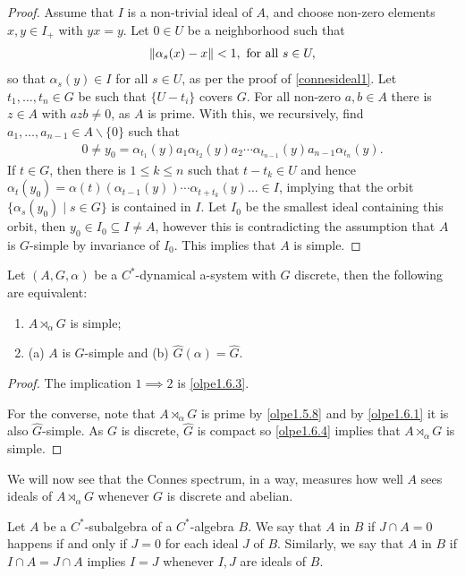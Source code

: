 \begin{proof}
	Assume that $I$ is a non-trivial ideal of $A$, and choose non-zero elements $x,y \in I_+$ with $yx=y$. Let $0 \in U$ be a neighborhood such that 
	\begin{align*}
		\left\lVert \alpha_s(x)-x\right\rVert < 1, \text{ for all }s \in U,
	\end{align*}
	so that $\alpha_s(y) \in I$ for all $s \in U$, as per the proof of \cref{connesideal1}. Let $t_1,\dots,t_n \in G$ be such that $\{ U - t_i\}$ covers $G$. For all non-zero $a,b \in A$ there is $z \in A$ with $azb \neq 0$, as $A$ is prime. With this, we recursively, find $a_1,\dots,a_{n-1} \in A \backslash \{0\}$ such that
	\begin{align*}
	0 \neq	y_0 = \alpha_{t_1}(y) a_1 \alpha_{t_2}(y) a_2\cdots \alpha_{t_{n-1}}(y) a_{n-1} \alpha_{t_n}(y).
	\end{align*}
	If $t \in G$, then there is $1 \leq k \leq n$ such that $t-t_k \in U$ and hence $\alpha_t(y_0) =\alpha(t)(\alpha_{t-1}(y)) \cdots \alpha_{t+t_k}(y) \dots \in I$, implying that the orbit $\{\alpha_s(y_0) \mid s \in G\}$ is contained in $I$. Let $I_0$ be the smallest ideal containing this orbit, then $y_0 \in I_0 \subseteq I \neq A$, however this is contradicting the assumption that $A$ is $G$-simple by invariance of $I_0$. This implies that $A$ is simple.
\end{proof}
\begin{theorem}
	Let $(A, G ,\alpha)$ be a $C^*$-dynamical a-system with $G$ discrete, then the following are equivalent:
	\begin{enumerate}[nosep]
		\item $A \rtimes_\alpha G$ is simple;
		\item (a) $A$ is $G$-simple and (b) $\hat G(\alpha) = \hat G$.
	\end{enumerate}
	\label{olpe1thm}
\end{theorem}
\begin{proof}
	The implication $1 \implies 2$ is \cref{olpe1.6.3}. 
	
	For the converse, note that $A \rtimes_\alpha G$ is prime by \cref{olpe1.5.8} and by \cref{olpe1.6.1} it is also $\hat G$-simple. As $G$ is discrete, $\hat G$ is compact so \cref{olpe1.6.4} implies that $A \rtimes_\alpha G$ is simple.
\end{proof}
We will now see that the Connes spectrum, in a way, measures how well $A$ sees ideals of $A \rtimes_\alpha G$ whenever $G$ is discrete and abelian.
\begin{definition}
	Let $A$ be a $C^*$-subalgebra of a $C^*$-algebra $B$. We say that $A$  in $B$ if $J \cap A = 0$ happens if and only if $J = 0$ for each ideal $J$ of $B$. Similarly, we say that $A$  in $B$ if $I \cap A = J \cap A$ implies $I=J$ whenever $I,J$ are ideals of $B$.
\end{definition}
